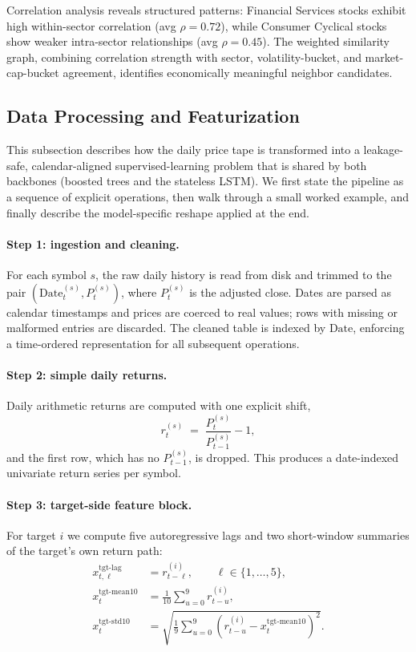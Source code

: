 \documentclass[12pt,a4paper,titlepage]{article}
\begin{document}
Correlation analysis reveals structured patterns: Financial Services stocks exhibit high within-sector correlation (avg $\rho=0.72$), while Consumer Cyclical stocks show weaker intra-sector relationships (avg $\rho=0.45$). The weighted similarity graph, combining correlation strength with sector, volatility-bucket, and market-cap-bucket agreement, identifies economically meaningful neighbor candidates.

\subsection{Data Processing and Featurization}
\label{sec:data-eng}

This subsection describes how the daily price tape is transformed into a leakage-safe, calendar-aligned supervised-learning problem that is shared by both backbones (boosted trees and the stateless LSTM). We first state the pipeline as a sequence of explicit operations, then walk through a small worked example, and finally describe the model-specific reshape applied at the end.

\paragraph{Step 1: ingestion and cleaning.}
For each symbol \(s\), the raw daily history is read from disk and trimmed to the pair \((\text{Date}_t^{(s)}, P_t^{(s)})\), where \(P_t^{(s)}\) is the adjusted close. Dates are parsed as calendar timestamps and prices are coerced to real values; rows with missing or malformed entries are discarded. The cleaned table is indexed by \(\text{Date}\), enforcing a time-ordered representation for all subsequent operations.

\paragraph{Step 2: simple daily returns.}
Daily arithmetic returns are computed with one explicit shift,
\begin{equation}
r_t^{(s)} \;=\; \frac{P_t^{(s)}}{P_{t-1}^{(s)}}-1,
\label{eq:daily-return}
\end{equation}
and the first row, which has no \(P_{t-1}^{(s)}\), is dropped. This produces a date-indexed univariate return series per symbol.

\paragraph{Step 3: target-side feature block.}
For target \(i\) we compute five autoregressive lags and two short-window summaries of the target's own return path:
\begin{align}
x_{t,\ell}^{\text{tgt-lag}} &= r_{t-\ell}^{(i)}, \qquad \ell\in\{1,\dots,5\}, \label{eq:tgt-lags}\\[2pt]
x_t^{\text{tgt-mean10}} &= \frac{1}{10}\sum_{u=0}^{9} r_{t-u}^{(i)}, \label{eq:tgt-mean}\\[2pt]
x_t^{\text{tgt-std10}}  &= \sqrt{\frac{1}{9}\sum_{u=0}^{9}\left(r_{t-u}^{(i)}-x_t^{\text{tgt-mean10}}\right)^{2}}. \label{eq:tgt-std}
\end{align}
\end{document}
